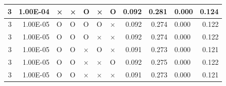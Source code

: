 \documentclass[11pt]{article}
\begin{document}
\begin{longtable}[h]{|r|r|l|l|l|l|l|r|r|l|r|}
3                                 & 1.00E-04                         & ×                                & ×                                & O                                & ×                                & O                                 & 0.092                             & 0.281                             & 0.000                              & 0.124                               \\ \hline
3                                 & 1.00E-05                         & O                                & O                                & O                                & O                                & ×                                 & 0.092                             & 0.274                             & 0.000                              & 0.122                               \\ \hline
3                                 & 1.00E-05                         & O                                & O                                & O                                & ×                                & ×                                 & 0.092                             & 0.274                             & 0.000                              & 0.122                               \\ \hline
3                                 & 1.00E-05                         & O                                & O                                & ×                                & O                                & ×                                 & 0.091                             & 0.273                             & 0.000                              & 0.121                               \\ \hline
3                                 & 1.00E-05                         & O                                & O                                & ×                                & ×                                & O                                 & 0.092                             & 0.275                             & 0.000                              & 0.122                               \\ \hline
3                                 & 1.00E-05                         & O                                & O                                & ×                                & ×                                & ×                                 & 0.091                             & 0.273                             & 0.000                              & 0.121                               \\ \hline

\end{longtable}
\end{document}
